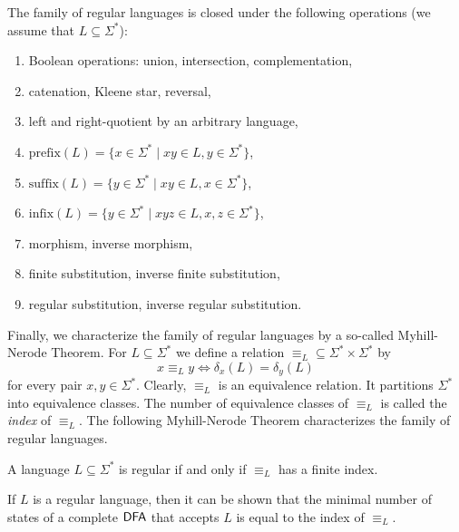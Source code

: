 \begin{theorem}
The family of regular languages is closed under the following operations (we assume that $L \subseteq \Sigma^*$):
\begin{enumerate}
\item Boolean operations: union, intersection, complementation,
\item catenation, Kleene star, reversal,
\item left and right-quotient by an arbitrary language,
\item $\text{prefix}(L) = \{x \in \Sigma^* \mid xy \in L, y \in \Sigma^*\}$,
\item $\text{suffix}(L) = \{y \in \Sigma^* \mid xy \in L, x \in \Sigma^*\}$,
\item $\text{infix}(L) = \{y \in \Sigma^* \mid xyz \in L, x,z \in \Sigma^*\}$,
\item morphism, inverse morphism,
\item finite substitution, inverse finite substitution,
\item regular substitution, inverse regular substitution.
\end{enumerate}
\end{theorem}

Finally, we characterize the family of regular languages by a so-called Myhill-Nerode Theorem. For $L \subseteq \Sigma^*$ we define a relation $\equiv_L \subseteq \Sigma^* \times \Sigma^*$ by
$$x \equiv_L y \Leftrightarrow \delta_x(L) = \delta_y(L)$$
for every pair $x, y \in \Sigma^*$. Clearly, $\equiv_L$ is an equivalence relation. It partitions $\Sigma^*$ into equivalence classes. The number of equivalence classes of $\equiv_L$ is called the \emph{index} of $\equiv_L$. 
The following Myhill-Nerode Theorem characterizes the family of regular languages.

\begin{theorem}
A language $L \subseteq \Sigma^*$ is regular if and only if $\equiv_L$ has a finite index.
\end{theorem}

If $L$ is a regular language, then it can be shown that the minimal number of states of a complete $\textup{\sf DFA}$ that accepts $L$ is equal to the index of $\equiv_L$.

